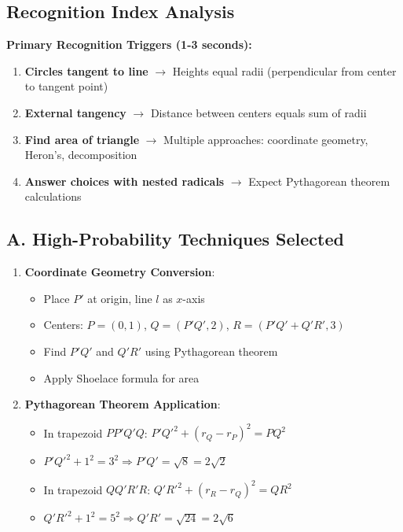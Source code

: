 \documentclass[]{article}
\begin{document}
\begin{techniquesbox}
\subsection*{Recognition Index Analysis}
\textbf{Primary Recognition Triggers (1-3 seconds):}
\begin{enumerate}
    \item \textbf{Circles tangent to line} $\rightarrow$ Heights equal radii (perpendicular from center to tangent point)
    \item \textbf{External tangency} $\rightarrow$ Distance between centers equals sum of radii
    \item \textbf{Find area of triangle} $\rightarrow$ Multiple approaches: coordinate geometry, Heron's, decomposition
    \item \textbf{Answer choices with nested radicals} $\rightarrow$ Expect Pythagorean theorem calculations
\end{enumerate}

\subsection*{A. High-Probability Techniques Selected}
\begin{enumerate}[leftmargin=*]
    \item \textbf{Coordinate Geometry Conversion}: 
    \begin{itemize}
        \item Place $P'$ at origin, line $l$ as $x$-axis
        \item Centers: $P = (0, 1)$, $Q = (P'Q', 2)$, $R = (P'Q' + Q'R', 3)$
        \item Find $P'Q'$ and $Q'R'$ using Pythagorean theorem
        \item Apply Shoelace formula for area
    \end{itemize}
    
    \item \textbf{Pythagorean Theorem Application}:
    \begin{itemize}
        \item In trapezoid $PP'Q'Q$: $P'Q'^2 + (r_Q - r_P)^2 = PQ^2$
        \item $P'Q'^2 + 1^2 = 3^2 \Rightarrow P'Q' = \sqrt{8} = 2\sqrt{2}$
        \item In trapezoid $QQ'R'R$: $Q'R'^2 + (r_R - r_Q)^2 = QR^2$
        \item $Q'R'^2 + 1^2 = 5^2 \Rightarrow Q'R' = \sqrt{24} = 2\sqrt{6}$
    \end{itemize}
    

\end{enumerate}
\end{techniquesbox}
\end{document}
